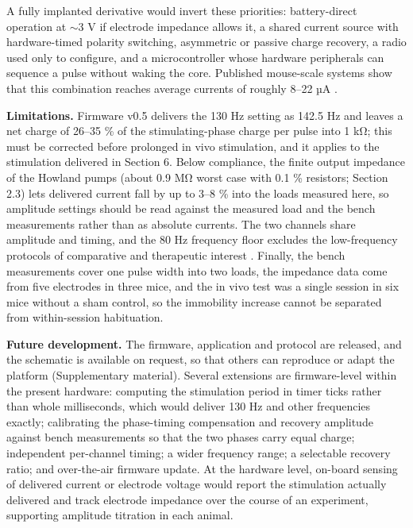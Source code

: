 A fully implanted derivative would invert these priorities: battery-direct operation at $\sim$3 V if electrode impedance allows it, a shared current source with hardware-timed polarity switching, asymmetric or passive charge recovery, a radio used only to configure, and a microcontroller whose hardware peripherals can sequence a pulse without waking the core. Published mouse-scale systems show that this combination reaches average currents of roughly 8--22 µA \citep{paulat2026,plocksties2021,grotemeyer2024,fleischer2020}.

\textbf{Limitations.} Firmware v0.5 delivers the 130 Hz setting as 142.5 Hz and leaves a net charge of 26--35 \% of the stimulating-phase charge per pulse into 1 kΩ; this must be corrected before prolonged in vivo stimulation, and it applies to the stimulation delivered in Section 6. Below compliance, the finite output impedance of the Howland pumps (about 0.9 MΩ worst case with 0.1 \% resistors; Section 2.3) lets delivered current fall by up to 3--8 \% into the loads measured here, so amplitude settings should be read against the measured load and the bench measurements rather than as absolute currents. The two channels share amplitude and timing, and the 80 Hz frequency floor excludes the low-frequency protocols of comparative and therapeutic interest \citep{creed2011,creed2015}. Finally, the bench measurements cover one pulse width into two loads, the impedance data come from five electrodes in three mice, and the in vivo test was a single session in six mice without a sham control, so the immobility increase cannot be separated from within-session habituation.

\textbf{Future development.} The firmware, application and protocol are released, and the schematic is available on request, so that others can reproduce or adapt the platform (Supplementary material). Several extensions are firmware-level within the present hardware: computing the stimulation period in timer ticks rather than whole milliseconds, which would deliver 130 Hz and other frequencies exactly; calibrating the phase-timing compensation and recovery amplitude against bench measurements so that the two phases carry equal charge; independent per-channel timing; a wider frequency range; a selectable recovery ratio; and over-the-air firmware update. At the hardware level, on-board sensing of delivered current or electrode voltage would report the stimulation actually delivered and track electrode impedance over the course of an experiment, supporting amplitude titration in each animal.

